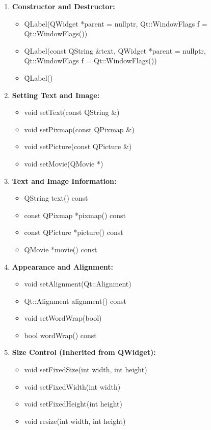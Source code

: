 \documentclass{report}
\begin{document}
    \pagebreak 
    \begin{enumerate}[label=\textbf{\arabic*.}]
        \item \textbf{Constructor and Destructor:}
        \begin{itemize}
            \item QLabel(QWidget *parent = nullptr, Qt::WindowFlags f = Qt::WindowFlags())
            \item QLabel(const QString \&text, QWidget *parent = nullptr, Qt::WindowFlags f = Qt::WindowFlags())
            \item \~QLabel()
        \end{itemize}

        \item \textbf{Setting Text and Image:}
        \begin{itemize}
            \item void setText(const QString \&)
            \item void setPixmap(const QPixmap \&)
            \item void setPicture(const QPicture \&)
            \item void setMovie(QMovie *)
        \end{itemize}

        \item \textbf{Text and Image Information:}
        \begin{itemize}
            \item QString text() const
            \item const QPixmap *pixmap() const
            \item const QPicture *picture() const
            \item QMovie *movie() const
        \end{itemize}

        \item \textbf{Appearance and Alignment:}
        \begin{itemize}
            \item void setAlignment(Qt::Alignment)
            \item Qt::Alignment alignment() const
            \item void setWordWrap(bool)
            \item bool wordWrap() const
        \end{itemize}

        \item \textbf{Size Control (Inherited from QWidget):}
        \begin{itemize}
            \item void setFixedSize(int width, int height)
            \item void setFixedWidth(int width)
            \item void setFixedHeight(int height)
            \item void resize(int width, int height)
        \end{itemize}


\end{enumerate}
\end{document}
